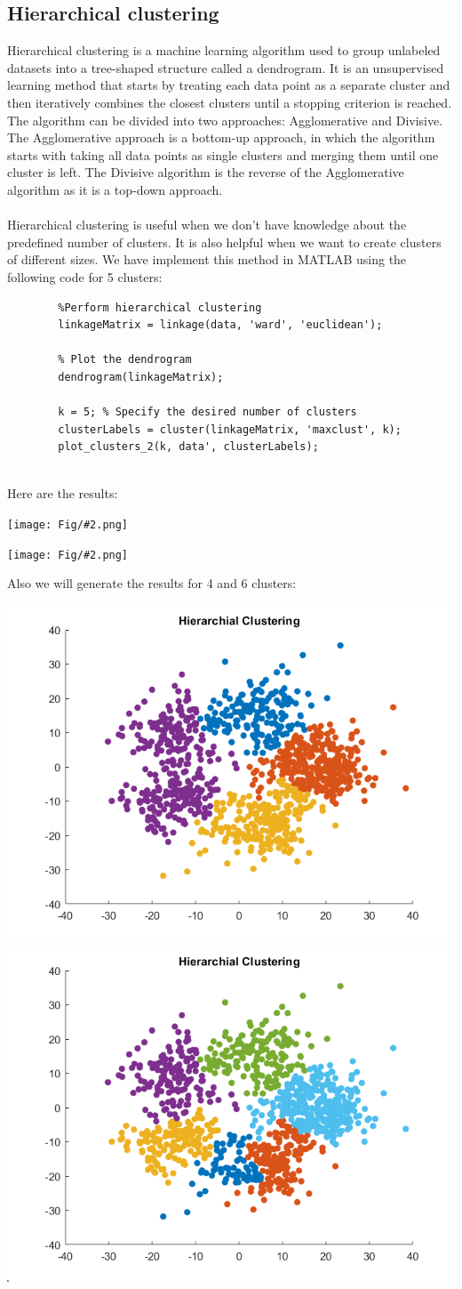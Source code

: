 \documentclass[]{article}
\newcommand{\pict}[2]{\begin{center}
		\texttt{[image: Fig/\#2.png]}
\end{center}}
\begin{document}
	\subsection{Hierarchical clustering}
	Hierarchical clustering is a machine learning algorithm used to group unlabeled datasets into a tree-shaped structure called a dendrogram. It is an unsupervised learning method that starts by treating each data point as a separate cluster and then iteratively combines the closest clusters until a stopping criterion is reached. The algorithm can be divided into two approaches: Agglomerative and Divisive. The Agglomerative approach is a bottom-up approach, in which the algorithm starts with taking all data points as single clusters and merging them until one cluster is left. The Divisive algorithm is the reverse of the Agglomerative algorithm as it is a top-down approach.\\\\
	Hierarchical clustering is useful when we don’t have knowledge about the predefined number of clusters. It is also helpful when we want to create clusters of different sizes.	We have implement this method in MATLAB using the following code for 5 clusters:
	\begin{lstlisting}
		%Perform hierarchical clustering
		linkageMatrix = linkage(data, 'ward', 'euclidean'); 
		
		% Plot the dendrogram
		dendrogram(linkageMatrix);
		
		k = 5; % Specify the desired number of clusters
		clusterLabels = cluster(linkageMatrix, 'maxclust', k);
		plot_clusters_2(k, data', clusterLabels);
		
	\end{lstlisting}
	Here are the results:
	\pict{0.4}{F17}
	\pict{0.7}{F16}
	Also we will generate the results for 4 and 6 clusters:
	\begin{center}
		\includegraphics[width=0.45\linewidth]{Fig/F18.png}
		\qquad
		\includegraphics[width=0.45\linewidth]{Fig/F19.png}
	\end{center}
\end{document}
